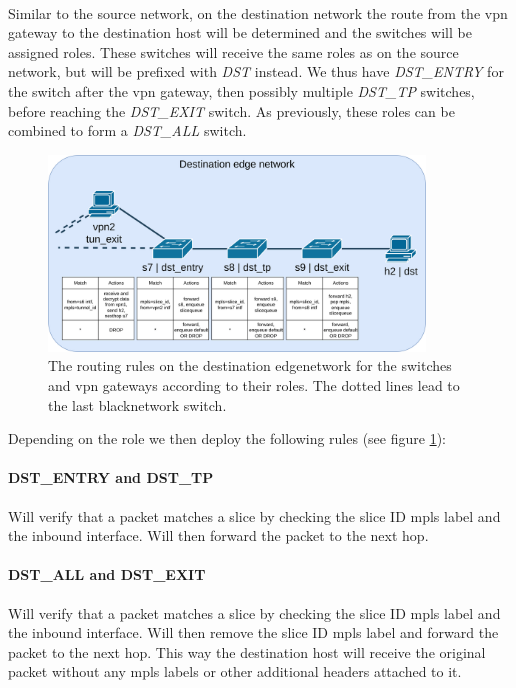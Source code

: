 \paragraph{} Similar to the source network, on the destination network the route from the \acrshort{vpn} gateway to the destination host will be determined and the switches will be assigned roles. These switches will receive the same roles as on the source network, but will be prefixed with \textit{DST} instead. We thus have \textit{DST\_ENTRY} for the switch after the \acrshort{vpn} gateway, then possibly multiple \textit{DST\_TP} switches, before reaching the \textit{DST\_EXIT} switch. As previously, these roles can be combined to form a \textit{DST\_ALL} switch.

\begin{figure}[ht]
    \centering
    \includegraphics[width=10cm]{images/chapter_6/routing_destination.png}
    \caption[Routing on the destination \gls{edgenetwork}]{The routing rules on the destination \gls{edgenetwork} for the switches and \acrshort{vpn} gateways according to their roles. The dotted lines lead to the last \gls{blacknetwork} switch.}
    \label{fig:routing_destination}
\end{figure}

Depending on the role we then deploy the following rules (see figure \ref{fig:routing_destination}):

\paragraph{DST\_ENTRY and DST\_TP} Will verify that a packet matches a slice by checking the slice ID \acrshort{mpls} label and the inbound interface. Will then forward the packet to the next hop.

\paragraph{DST\_ALL and DST\_EXIT} Will verify that a packet matches a slice by checking the slice ID \acrshort{mpls} label and the inbound interface. Will then remove the slice ID \acrshort{mpls} label and forward the packet to the next hop. This way the destination host will receive the original packet without any \acrshort{mpls} labels or other additional headers attached to it.

